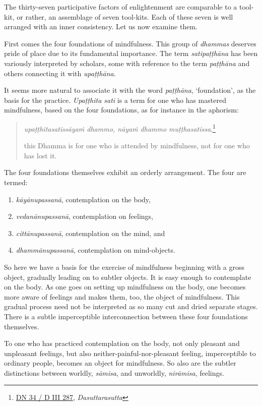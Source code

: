 The thirty-seven participative factors of enlightenment are comparable to a tool-kit, or rather, an assemblage of seven tool-kits. Each of these seven is well arranged with an inner consistency. Let us now examine them.

First comes the four foundations of mindfulness. This group of \emph{dhammas} deserves pride of place due to its fundamental importance. The term \emph{satipaṭṭhāna} has been variously interpreted by scholars, some with reference to the term \emph{paṭṭhāna} and others connecting it with \emph{upaṭṭhāna}.

It seems more natural to associate it with the word \emph{paṭṭhāna}, `foundation', as the basis for the practice. \emph{Upaṭṭhita sati} is a term for one who has mastered mindfulness, based on the four foundations, as for instance in the aphorism:

\begin{quote}
\emph{upaṭṭhitasatissāyaṁ dhammo, nāyaṁ dhammo muṭṭhasatissa},\footnote{\href{https://suttacentral.net/dn34/pli/ms}{DN 34 / D III 287}, \emph{Dasuttarasutta}}

this Dhamma is for one who is attended by mindfulness, not for one who has lost it.
\end{quote}

The four foundations themselves exhibit an orderly arrangement. The four are termed:

\begin{enumerate}
\def\labelenumi{\arabic{enumi}.}
\tightlist
\item
  \emph{kāyānupassanā}, contemplation on the body,
\item
  \emph{vedanānupassanā}, contemplation on feelings,
\item
  \emph{cittānupassanā}, contemplation on the mind, and
\item
  \emph{dhammānupassanā}, contemplation on mind-objects.
\end{enumerate}

So here we have a basis for the exercise of mindfulness beginning with a gross object, gradually leading on to subtler objects. It is easy enough to contemplate on the body. As one goes on setting up mindfulness on the body, one becomes more aware of feelings and makes them, too, the object of mindfulness. This gradual process need not be interpreted as so many cut and dried separate stages. There is a subtle imperceptible interconnection between these four foundations themselves.

To one who has practiced contemplation on the body, not only pleasant and unpleasant feelings, but also neither-painful-nor-pleasant feeling, imperceptible to ordinary people, becomes an object for mindfulness. So also are the subtler distinctions between worldly, \emph{sāmisa}, and unworldly, \emph{nirāmisa}, feelings.

